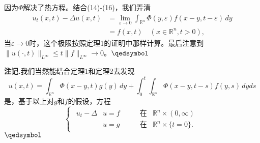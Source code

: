 \documentclass[leqno]{article}
\numberwithin{equation}{subsection}%
\begin{document}
因为$\Phi$解决了热方程。结合(14)-(16)，我们弄清
\begin{equation*}
\begin{aligned}
u_{t}(x,t)-\Delta u(x,t)&=\lim\limits_{\varepsilon\rightarrow 0}\int_{\mathbb{R}^{n}}\Phi(y,\varepsilon)f(x-y,t-\varepsilon)\,dy\\
&=f(x,t)\quad(x\in\mathbb{R}^{n},t>0),
\end{aligned}
\end{equation*}
当$\varepsilon\rightarrow 0$时，这个极限按照定理1的证明中那样计算。最后注意到$\|u(\cdot,t)\|_{L^{\infty}}\leq t\|f\|_{L^{\infty}}\rightarrow 0$。$\hfill\qedsymbol$
\par
\noindent\textbf{注记.}我们当然能结合定理1和定理2去发现
\begin{equation}
u(x,t)=\int_{\mathbb{R}^{n}}\Phi(x-y,t)g(y)\,dy+\int_{0}^{t}\int_{\mathbb{R}^{n}}\Phi(x-y,t-s)f(y,s)\,dyds
\end{equation}
是，基于以上对$g$和$f$的假设，方程
\begin{equation}
\begin{cases}
\begin{aligned}
u_{t}-\Delta &u=f\qquad&\text{在}&\mathbb{R}^{n}\times(0,\infty)\\
&u=g&\text{在}&\mathbb{R}^{n}\times\{t=0\}.
\end{aligned}
\end{cases}
\end{equation}
$\hfill\qedsymbol$
\end{document}
